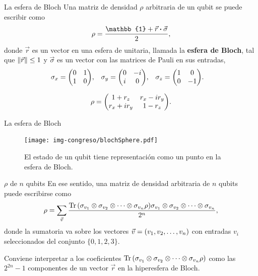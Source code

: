 \documentclass[11pt]{beamer}
\begin{document}
\begin{frame}{La esfera de Bloch}
Una matriz de densidad $\rho$ arbitraria de un qubit se puede escribir como
\begin{equation}
	\rho = \frac{\mathbb{1} + \vec{r}\vdot \vec{\sigma}}{2}, 
\end{equation}
donde $\vec{r}$ es un vector en una esfera de unitaria, llamada la
\textbf{esfera de Bloch}, tal que $\norm{
\vec{r}} \leq 1$ y $\vec{\sigma}$ es un 
vector con las matrices de Pauli en sus entradas,
\begin{align*}
	\sigma _x &= \mqty(0&1 \\ 1&0), &
	\sigma _y &= \mqty(0&-i \\ i&0), &	
	\sigma _z &= \mqty(1&0 \\ 0&-1).
\end{align*}

\begin{equation}
	\rho = \mqty(1 + r_z & r_x - ir_y \\
								r_x + ir_y & 1 - r_z). 
\end{equation}
\end{frame}


\begin{frame}{La esfera de Bloch}
\begin{figure}
	\centering
	\texttt{[image: img-congreso/blochSphere.pdf]}
	\caption{El estado de un qubit tiene representación como un punto en la
	esfera de Bloch.}
\end{figure}
\end{frame}


\begin{frame}{$\rho$ de $n$ qubits}
	En ese sentido, una matriz de densidad arbitraria de $n$ qubits puede 
	escribirse como
	\begin{equation}
		\rho = \sum _{\vec{v}}\frac{\Tr \qty(\sigma _{v_1} \otimes \sigma _{v_2} 
		\otimes 
		\cdots \otimes \sigma _{v_n} \rho)
		\sigma _{v_1} \otimes \sigma _{v_2} \otimes 
		\cdots \otimes \sigma _{v_n}}{2^n},
	\end{equation}
	donde la sumatoria va sobre los vectores $\vec{v}=\qty(v_1, v_2, \ldots, v_n)$
	con entradas $v_i$ seleccionados del conjunto $\{0,1,2,3\}$. \vfill
	
	Conviene	interpretar a los coeficientes
	$\Tr \qty(\sigma _{v_1} \otimes \sigma _{v_2} 
	\otimes \cdots \otimes \sigma _{v_n} \rho)$ 
	como las $2^{2n}-1$ componentes de un vector $\vec{r}$ en la hiperesfera 
	de Bloch.
\end{frame}
\end{document}
